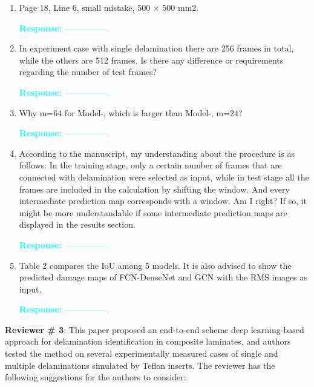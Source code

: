 \documentclass[11pt,a2paper]{report}
\newcommand{\RNum}[1]{\uppercase\expandafter{\romannumeral #1\relax}}
\begin{document}
\begin{enumerate}
	\item Page 18, Line 6, small mistake, 500 × 500 mm2.
	
	\textcolor{Cyan}{
		\textbf{Response:}
		---------------.
	}	

	\item In experiment case with single delamination there are 256 frames in 
	total, while the others are 512 frames. Is there any difference or 
	requirements regarding the number of test frames?

\textcolor{Cyan}{
	\textbf{Response:}
	---------------.
}

	\item Why m=64 for Model-\RNum{1}, which is larger than Model-\RNum{2}, 
	m=24?

\textcolor{Cyan}{
	\textbf{Response:}
	---------------.
}

	\item According to the manuscript, my understanding about the procedure is 
	as follows: In the training stage, only a certain number of frames that are 
	connected with delamination were selected as input, while in test stage all 
	the frames are included in the calculation by shifting the window. And 
	every intermediate prediction map corresponds with a window. Am I right? If 
	so, it might be more understandable if some intermediate prediction maps 
	are displayed in the results section.

\textcolor{Cyan}{
	\textbf{Response:}
	---------------.
}

	\item Table 2 compares the IoU among 5 models. It is also advised to show 
	the predicted damage maps of FCN-DenseNet and GCN with the RMS images as 
	input.

\textcolor{Cyan}{
	\textbf{Response:}
	---------------.
}

\end{enumerate}	

\newpage 
\textbf{Reviewer \# 3}:
\newline This paper proposed an end-to-end scheme deep learning-based approach 
for delamination identification in composite laminates, and authors tested the 
method on several experimentally measured cases of single and multiple 
delaminations simulated by Teﬂon inserts. The reviewer has the following 
suggestions for the authors to consider:
\end{document}
